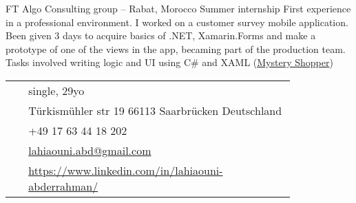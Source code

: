 \documentclass[10pt]{article} %
\begin{document}
\begin{paracol}{2}
\vspace{-\baselineskip}\medskip %

{FT} %
{Algo Consulting group -- Rabat, Morocco} %
{Summer internship} %
{First experience in a professional environment. I worked on a customer survey mobile application. Been given 3 days to acquire basics of .NET, Xamarin.Forms and make a prototype of one of the views in the app, becaming part of the production team. Tasks involved writing logic and UI using C\# and XAML (\href{https://play.google.com/store/apps/details?id=ma.ram.customersurvey\&hl=en}{Mystery Shopper})}  %


\vspace{-\baselineskip}\medskip %

\medskip %


\switchcolumn %


\parbox[top][0.10\textheight][c]{\linewidth}{ %
	\vspace{-0.05\textheight} %
	\colorbox{shade}{ %
		\begin{supertabular}{p{0.05\linewidth}|p{0.775\linewidth}} %
			\raisebox{-1pt}{\faUser} & single, 29yo\\ %
			\raisebox{-1pt}{\faHome} & Türkismühler str 19 66113 Saarbrücken Deutschland \\ %
			\raisebox{-1pt}{\faPhone} & +49 17 63 44 18 202 \\ %
			\raisebox{0pt}{\small\faEnvelope} & \href{mailto:lahiaouni.abd@gmail.com}{lahiaouni.abd@gmail.com} \\ %
			\raisebox{-1pt}{\faLinkedinSquare} & \href{https://www.linkedin.com/in/lahiaouni-abderrahman/}{https://www.linkedin.com/in/lahiaouni-abderrahman/} \\ %
		\end{supertabular}
	}
}


\end{paracol}
\end{document}
